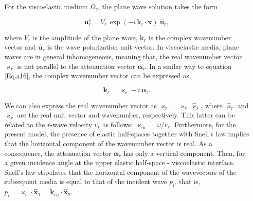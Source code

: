 \documentclass[draft]{agujournal2019}
\begin{document}
For the viscoelastic medium $\Omega_v$, the plane wave solution takes the form
\begin{linenomath*}
\begin{equation}\label{Eq.b5}
\bm{u}_r^v = V_r\, \exp (- i \,\bm{k}_r \cdot \bm {x} ) \; \bm{\hat {u}}_r, 
\end{equation}
\end{linenomath*}
where $V_r$ is the amplitude of the plane wave, $\bm{k}_r$ is the complex wavenumber vector and $\bm{\hat {u}}_r$ is the wave polarization unit vector. In viscoelastic media, plane waves are in general inhomogeneous,
meaning that, the real wavenumber vector $\bm{\varkappa}_r $  is not parallel to the attenuation vector $\bm{\alpha}_r$.  In a smilar way to equation \eqref{Eq.a16}, the complex wavenumber vector can be expressed as
\begin{linenomath*}
\begin{equation}\label{Eq.b6}
\bm{k}_r= \bm{\varkappa}_r - i\, \bm{\alpha}_r.
\end{equation}
\end{linenomath*}
We can also express the real wavenumber vector as $\bm{\varkappa}_r = {\varkappa}_r \, \bm{\hat{\varkappa}}_r $, where $\bm{\hat{\varkappa}}_r$ and ${\varkappa}_r$ are the real unit vector and  wavenumber, respectively. This latter can be related to the $r$-wave velocity $v_r$ as follows: ${\varkappa}_m = \omega/v_r$.
Furthermore, for the present model, the presence of elastic half-spaces together with Snell's law implies that the horizontal component of the wavenumber vector is real. As a consequence, the attenuation vector $\bm{\alpha}_r$ has only a vertical component. Then, for a given incidence angle at the upper elastic half-space - viscoelastic interface, Snell's law stipulates that the horizontal component of the wavevectors of the subsequent media is equal to that of the incident wave $p_i$, that is, $p_i = \bm{\varkappa}_{r} \cdot \bm{\hat{x}_1} = \bm{k}_{nj} \cdot \bm{\hat{x}_1}$.
\end{document}
